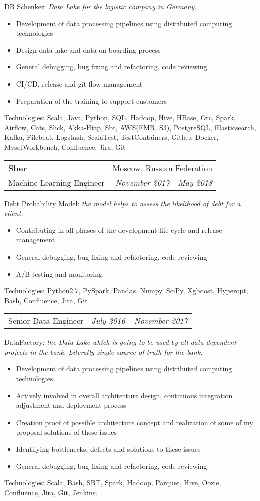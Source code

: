 \documentclass[letterpaper,11pt]{article}
\makeatletter
\newcommand{\sepsection}{\vspace{25pt}}
\newcommand{\resumeItem}[1]{%
  \item\small{
    #1
  }
}
\newcommand{\resumeSubheading}[4]{
  \vspace{8pt}\item%
    \begin{tabular*}{0.97\textwidth}[t]{l@{\extracolsep{\fill}}r}
      \textbf{#1} & #2 \\
      \textnormal{#3} & \textit{\small #4} \\
    \end{tabular*}\vspace{-5pt}
}
\newcommand{\resumeSubSubheading}[2]{
    \vspace{5pt}
    \begin{tabular*}{0.97\textwidth}{l@{\extracolsep{\fill}}r}
      \textnormal{#1} & \textit{\small #2} \\
    \end{tabular*}\vspace{-5pt}
}
\newcommand{\resumeProjectDescription}[2]{\vspace{5pt} \textnormal{#1:} \textit{\small#2}}
\newcommand{\resumeItemListStart}{\begin{itemize}}
\newcommand{\resumeItemListEnd}{\end{itemize}\vspace{-5pt}}
\newcommand{\resumeTech}[2]{
 \underline{#1:} #2
}
\makeatother
\begin{document}
      \resumeProjectDescription{DB Schenker}{Data Lake for the logistic company in Germany.}

      \resumeItemListStart
      \resumeItem{Development of data processing pipelines using distributed computing technologies}
      \resumeItem{Design data lake and data on-boarding process}
      \resumeItem{General debugging, bug fixing and refactoring, code reviewing}
      \resumeItem{CI/CD, release and git flow management}
      \resumeItem{Preparation of the training to support customers}
      \resumeItemListEnd
      \resumeTech{Technologies}{Scala, Java, Python, SQL, Hadoop, Hive, HBase, Orc, Spark, Airflow, Cats, Slick, Akka-Http, Sbt, AWS(EMR, S3), PostgreSQL, Elasticsearch, Kafka, Filebeat, Logstash, ScalaTest, TestContainers, Gitlab, Docker, MysqlWorkbench, Confluence, Jira, Git}\\
      
    \sepsection

    \resumeSubheading
      {Sber \href{https://www.sberbank.ru/}{\color{urlcolor}\faicon{link}}}{Moscow, Russian Federation}
      {Machine Learning Engineer}{November 2017 - May 2018}

      \resumeProjectDescription{Debt Probability Model}{the model helps to assess the likelihood of debt for a client.}

      \resumeItemListStart
      \resumeItem{Contributing in all phases of the development life-cycle and release management}
      \resumeItem{General debugging, bug fixing and refactoring, code reviewing}
      \resumeItem{A/B testing and monitoring}
      \resumeItemListEnd
      \resumeTech{Technologies}{Python2.7, PySpark, Pandas, Numpy, SciPy, Xgboost, Hyperopt, Bash, Confluence, Jira, Git}

    \resumeSubSubheading
      {Senior Data Engineer}{July 2016 - November 2017}

      \resumeProjectDescription{DataFactory}{the Data Lake which is going to be used by all data-dependent projects in the bank. Literally single source of truth for the bank.}

      \resumeItemListStart
      \resumeItem{Development of data processing pipelines using distributed computing technologies}
      \resumeItem{Actively involved in overall architecture design, continuous integration adjustment and deployment process}
      \resumeItem{Creation proof of possible architecture concept and realization of some of my proposal solutions of these issues}
      \resumeItem{Identifying bottlenecks, defects and solutions to these issues}
      \resumeItem{General debugging, bug fixing and refactoring, code reviewing}
      \resumeItemListEnd
      \resumeTech{Technologies}{Scala, Bash, SBT, Spark, Hadoop, Parquet, Hive, Oozie, Confluence, Jira, Git, Jenkins.}\\
    
\end{document}
